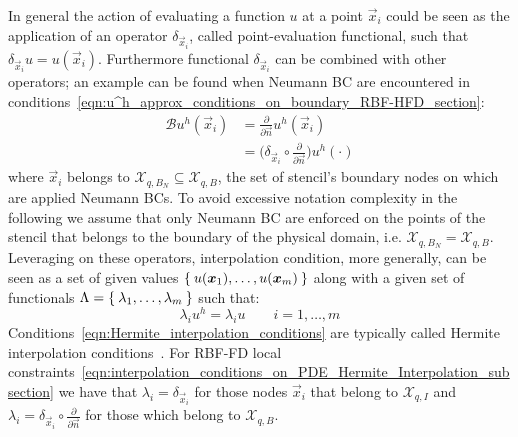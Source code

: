 In general the action of evaluating a function $u$ at a point $\vec{x}_i$ could be seen as the application of an operator $\delta_{\vec{x}_i}$, called point-evaluation functional, such that $\delta_{\vec{x}_i} u = u(\vec{x}_i)$. Furthermore functional $\delta_{\vec{x}_i}$ can be combined with other operators; an example can be found when Neumann BC are encountered in conditions~\eqref{eqn:u^h_approx_conditions_on_boundary_RBF-HFD_section}:
\begin{equation}
	\begin{aligned}
		\mathcal{B} u^h(\vec{x}_i) & = \frac{\partial}{\partial \vec{n}} u^h(\vec{x}_i)											\\
								   & = \bigg( \delta_{\vec{x}_i} \circ \frac{\partial}{\partial \vec{n}} \bigg) u^h(\cdot)
	\end{aligned}
\end{equation}
where $\vec{x}_i$ belongs to $\mathcal{X}_{q,B_N} \subseteq \mathcal{X}_{q,B}$, the set of stencil's boundary nodes on which are applied Neumann BCs. To avoid excessive notation complexity in the following we assume that only Neumann BC are enforced on the points of the stencil that belongs to the boundary of the physical domain, i.e. $\mathcal{X}_{q,B_N} = \mathcal{X}_{q,B}$.
Leveraging on these operators, interpolation condition, more generally, can be seen as a set of given values $\Set{u(\boldsymbol{x}_1), \dots, u(\boldsymbol{x}_{m})}$ along with a given set of functionals $\Lambda = \Set{\lambda_1, \dots, \lambda_{m}}$ such that:
\begin{equation}
	\label{eqn:Hermite_interpolation_conditions}
	\lambda_i u^h = \lambda_i u \qquad i = 1, \dots, m
\end{equation}
Conditions~\eqref{eqn:Hermite_interpolation_conditions} are typically called Hermite interpolation conditions~\cite{Fasshauer:details_on_basic_functions}.
For RBF-FD local constraints~\eqref{eqn:interpolation_conditions_on_PDE_Hermite_Interpolation_subsection} we have that $\lambda_i = \delta_{\vec{x}_i}$ for those nodes $\vec{x}_i$ that belong to $\mathcal{X}_{q,I}$ and $\lambda_i = \delta_{\vec{x}_i} \circ \frac{\partial}{\partial \vec{n}}$ for those which belong to $\mathcal{X}_{q,B}$.


